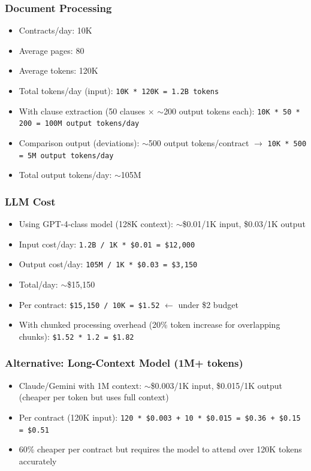 \subsubsection*{Document Processing}

\begin{itemize}
  \item Contracts/day: 10K
  \item Average pages: 80
  \item Average tokens: 120K
  \item Total tokens/day (input): \texttt{10K * 120K = 1.2B tokens}
  \item With clause extraction (50 clauses $\times$ $\sim$200 output tokens each): \texttt{10K * 50 * 200 = 100M output tokens/day}
  \item Comparison output (deviations): $\sim$500 output tokens/contract $\rightarrow$ \texttt{10K * 500 = 5M output tokens/day}
  \item Total output tokens/day: $\sim$105M
\end{itemize}

\subsubsection*{LLM Cost}

\begin{itemize}
  \item Using GPT-4-class model (128K context): $\sim$\$0.01/1K input, \$0.03/1K output
  \item Input cost/day: \texttt{1.2B / 1K * \$0.01 = \$12,000}
  \item Output cost/day: \texttt{105M / 1K * \$0.03 = \$3,150}
  \item Total/day: $\sim$\$15,150
  \item Per contract: \texttt{\$15,150 / 10K = \$1.52} $\leftarrow$ under \$2 budget
  \item With chunked processing overhead (20\% token increase for overlapping chunks): \texttt{\$1.52 * 1.2 = \$1.82}
\end{itemize}

\subsubsection*{Alternative: Long-Context Model (1M+ tokens)}

\begin{itemize}
  \item Claude/Gemini with 1M context: $\sim$\$0.003/1K input, \$0.015/1K output (cheaper per token but uses full context)
  \item Per contract (120K input): \texttt{120 * \$0.003 + 10 * \$0.015 = \$0.36 + \$0.15 = \$0.51}
  \item 60\% cheaper per contract but requires the model to attend over 120K tokens accurately
\end{itemize}

